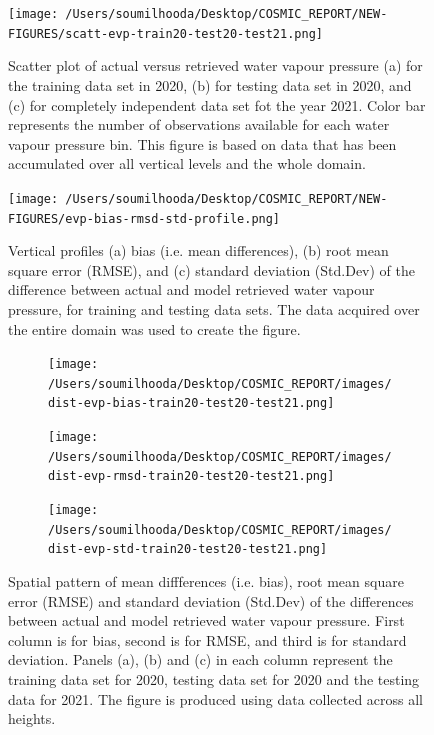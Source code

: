 \documentclass[a4paper,12pt,twoside]{article}
\begin{document}
\begin{figure}[H]
	\centering
	\texttt{[image: /Users/soumilhooda/Desktop/COSMIC\_REPORT/NEW-FIGURES/scatt-evp-train20-test20-test21.png]}
	\caption{Scatter plot of actual versus retrieved water vapour pressure (a) for the training data set in 2020, (b) for testing data set in 2020, and (c) for completely independent data set fot the year 2021. Color bar represents the number of observations available for each water vapour pressure bin. This figure is based on data that has been accumulated over all vertical levels and the whole domain.}
	\label{fig:scatt-evp-train20-test20-test21}
\end{figure}
\begin{figure}[H]
\centering
\texttt{[image: /Users/soumilhooda/Desktop/COSMIC\_REPORT/NEW-FIGURES/evp-bias-rmsd-std-profile.png]}
\caption{Vertical profiles (a) bias (i.e. mean differences), (b) root mean square error (RMSE), and (c) standard deviation (Std.Dev) of the difference between actual and model retrieved water vapour pressure, for training and testing data sets. The data acquired over the entire domain was used to create the figure. }
\label{fig:img19}
\end{figure}
\begin{figure}[H]
	\centering
	\begin{subfigure}{0.32\textwidth}
		\centering
		\texttt{[image: /Users/soumilhooda/Desktop/COSMIC\_REPORT/images/dist-evp-bias-train20-test20-test21.png]}
	\end{subfigure}
	\hfill
	\begin{subfigure}{0.32\textwidth}
		\centering
		\texttt{[image: /Users/soumilhooda/Desktop/COSMIC\_REPORT/images/dist-evp-rmsd-train20-test20-test21.png]}
	\end{subfigure}
	\hfill
	\begin{subfigure}{0.32\textwidth}
		\centering
		\texttt{[image: /Users/soumilhooda/Desktop/COSMIC\_REPORT/images/dist-evp-std-train20-test20-test21.png]}
	\end{subfigure}
	\caption{Spatial pattern of mean diffferences (i.e. bias), root mean square error (RMSE) and standard deviation (Std.Dev) of the differences between actual and model retrieved water vapour pressure. First column is for bias, second is for RMSE, and third is for standard deviation. Panels (a), (b) and (c) in each column represent the training data set for 2020, testing data set for 2020 and the testing data for 2021. The figure is produced using data collected across all heights.}
\label{fig:img11}
\end{figure}
\end{document}

